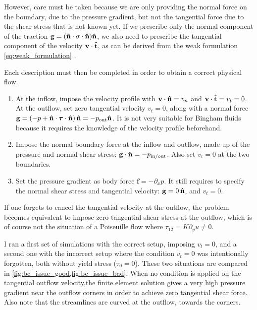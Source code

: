 \documentclass[11 pt]{report}
\begin{document}
However, care must be taken because we are only providing the normal force on the boundary, due to the pressure gradient, but not the tangential force due to the shear stress that is not known yet. If we prescribe only the normal component of the traction $\mathbf{g}=(\mathbf{\hat n}\cdot\mathbf{\sigma}\cdot\mathbf{\hat n})\mathbf{\hat n}$, we also need to prescribe the tangential component of the velocity $\mathbf{v}\cdot\mathbf{\hat t}$, as can be derived from the weak formulation \cref{eq:weak_formulation} \cite{Bangerth}.

Each description must then be completed in order to obtain a correct physical flow.
\begin{enumerate}[topsep=0pt]
    \setlength{\itemsep}{0pt}
    \item At the inflow, impose the velocity profile with $\mathbf{v} \cdot \mathbf{\hat n} = v_n$ and $\mathbf{v} \cdot \mathbf{\hat t} = v_t = 0$. At the outflow, set zero tangential velocity $v_t = 0$, along with a normal force $\mathbf{g} = (-p + \mathbf{\hat n}\cdot\boldsymbol\tau\cdot\mathbf{\hat n})\,\mathbf{\hat n} = -p_{\text{out}}\mathbf{\hat n}$. It is not very suitable for Bingham fluids because it requires the knowledge of the velocity profile beforehand.
    \item Impose the normal boundary force at the inflow and outflow, made up of the pressure and normal shear stress: $\mathbf{g} \cdot \mathbf{\hat n} = -p_{\text{in/out}}$. Also set $v_t=0$ at the two boundaries.
    \item Set the pressure gradient as body force $\mathbf{f} = -\partial_x p$. It still requires to specify the normal shear stress and tangential velocity: $\mathbf{g} = 0 \,\mathbf{\hat n}$, and $v_t=0$.
\end{enumerate}

If one forgets to cancel the tangential velocity at the outflow, the problem becomes equivalent to impose zero tangential shear stress at the outflow, which is of course not the situation of a Poiseuille flow where $\tau_{12} = K\partial_y u \neq 0$. 

I ran a first set of simulations with the correct setup, imposing $v_t=0$, and a second one with the incorrect setup where the condition $v_t=0$ was intentionally forgotten, both without yield stress ($\tau_0=0$). These two situations are compared in \cref{fig:bc_issue_good,fig:bc_issue_bad}. When no condition is applied on the tangential outflow velocity,the finite element solution gives a very high pressure gradient near the outflow corners in order to achieve zero tangential shear force. Also note that the streamlines are curved at the outflow, towards the corners.
\end{document}
